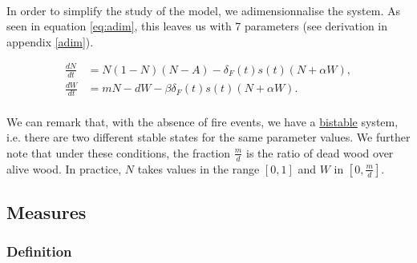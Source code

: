 \documentclass{article}
\begin{document}
\paragraph{}
In order to simplify the study of the model, we adimensionnalise the system. As seen in equation \ref{eq:adim}, this leaves us with 7 parameters (see derivation in appendix \ref{adim}). 

\begin{subequations}\label{eq:adim}
 \begin{align}
\frac{dN}{dt} & =  N(1-N)(N-A) - \delta_F(t)s(t)(N+\alpha W), \\
\frac{dW}{dt} & =  mN -dW - \beta\delta_F(t)s(t)(N+\alpha W).
 \end{align}
\end{subequations}

\paragraph{} %
We can remark that, with the absence of fire events, we have a \hyperref[equi]{bistable} system, i.e. there are two different stable states for the same parameter values. We further note that under these conditions, the fraction $\frac{m}{d}$ is the ratio of dead wood over alive wood. In practice, $N$ takes values in the range $[0,1]$ and $W$ in $[0, \frac{m}{d}]$.





\subsection{Measures}


\subsubsection{Definition}
\label{collapse_probability}
\end{document}

